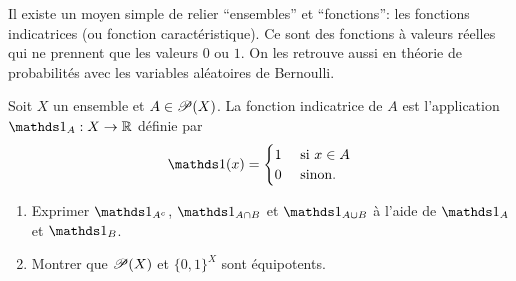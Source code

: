 \begin{remark}
    Il existe un moyen simple de relier ``ensembles'' et ``fonctions'': les fonctions indicatrices (ou fonction caractéristique). Ce sont des fonctions à valeurs réelles qui ne prennent que les valeurs \(0\) ou \(1\). On les retrouve aussi en théorie de probabilités avec les variables aléatoires de Bernoulli.
\end{remark}
\begin{td-exo}
    Soit \(X\) un ensemble et \(A\in\mathscr{P}(X)\). La fonction indicatrice de \(A\) est l'application \(\one_A:X\to\bbR\) définie par
    \[
    \one(x)=\begin{cases}
                        1 & \mbox{ si } x\in A \\
                        0 & \mbox{ sinon.}
    \end{cases}
    \]
    \begin{enumerate}
        \item Exprimer \(\one_{A^c}\), \(\one_{A\cap B}\) et \(\one_{A\cup B}\) à l'aide de \(\one_A\) et \(\one_B\).
        
        \item Montrer que \(\mathscr{P}(X)\) et \({\{0,1\}}^X\) sont équipotents.
    \end{enumerate}
\end{td-exo}
